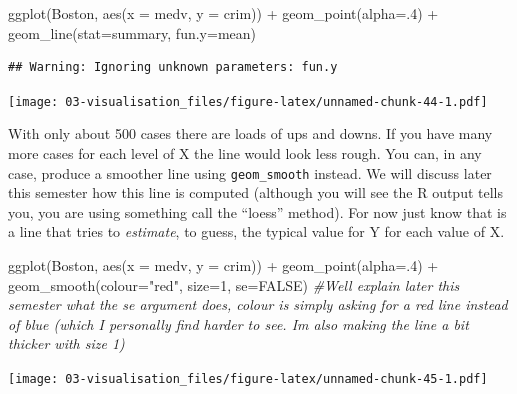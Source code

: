\documentclass[
]{book}
\newenvironment{Shaded}{\begin{snugshade}}{\end{snugshade}}
\newcommand{\AttributeTok}[1]{\textcolor[rgb]{0.77,0.63,0.00}{#1}}
\newcommand{\CommentTok}[1]{\textcolor[rgb]{0.56,0.35,0.01}{\textit{#1}}}
\newcommand{\ConstantTok}[1]{\textcolor[rgb]{0.00,0.00,0.00}{#1}}
\newcommand{\DecValTok}[1]{\textcolor[rgb]{0.00,0.00,0.81}{#1}}
\newcommand{\FunctionTok}[1]{\textcolor[rgb]{0.00,0.00,0.00}{#1}}
\newcommand{\NormalTok}[1]{#1}
\newcommand{\SpecialCharTok}[1]{\textcolor[rgb]{0.00,0.00,0.00}{#1}}
\newcommand{\StringTok}[1]{\textcolor[rgb]{0.31,0.60,0.02}{#1}}
\begin{document}
\begin{Shaded}
\begin{Highlighting}[]
\FunctionTok{ggplot}\NormalTok{(Boston, }\FunctionTok{aes}\NormalTok{(}\AttributeTok{x =}\NormalTok{ medv, }\AttributeTok{y =}\NormalTok{ crim)) }\SpecialCharTok{+}
  \FunctionTok{geom\_point}\NormalTok{(}\AttributeTok{alpha=}\NormalTok{.}\DecValTok{4}\NormalTok{) }\SpecialCharTok{+}
  \FunctionTok{geom\_line}\NormalTok{(}\AttributeTok{stat=}\StringTok{\textquotesingle{}summary\textquotesingle{}}\NormalTok{, }\AttributeTok{fun.y=}\NormalTok{mean)}
\end{Highlighting}
\end{Shaded}

\begin{verbatim}
## Warning: Ignoring unknown parameters: fun.y
\end{verbatim}

\texttt{[image: 03-visualisation\_files/figure-latex/unnamed-chunk-44-1.pdf]}

With only about 500 cases there are loads of ups and downs. If you have many more cases for each level of X the line would look less rough. You can, in any case, produce a smoother line using \texttt{geom\_smooth} instead. We will discuss later this semester how this line is computed (although you will see the R output tells you, you are using something call the ``loess'' method). For now just know that is a line that tries to \emph{estimate}, to guess, the typical value for Y for each value of X.

\begin{Shaded}
\begin{Highlighting}[]
\FunctionTok{ggplot}\NormalTok{(Boston, }\FunctionTok{aes}\NormalTok{(}\AttributeTok{x =}\NormalTok{ medv, }\AttributeTok{y =}\NormalTok{ crim)) }\SpecialCharTok{+}
  \FunctionTok{geom\_point}\NormalTok{(}\AttributeTok{alpha=}\NormalTok{.}\DecValTok{4}\NormalTok{) }\SpecialCharTok{+}
  \FunctionTok{geom\_smooth}\NormalTok{(}\AttributeTok{colour=}\StringTok{"red"}\NormalTok{, }\AttributeTok{size=}\DecValTok{1}\NormalTok{, }\AttributeTok{se=}\ConstantTok{FALSE}\NormalTok{) }\CommentTok{\#We\textquotesingle{}ll explain later this semester what the se argument does, colour is simply asking for a red line instead of blue (which I personally find harder to see. I\textquotesingle{}m also making the line a bit thicker with size 1)}
\end{Highlighting}
\end{Shaded}

\texttt{[image: 03-visualisation\_files/figure-latex/unnamed-chunk-45-1.pdf]}
\end{document}
